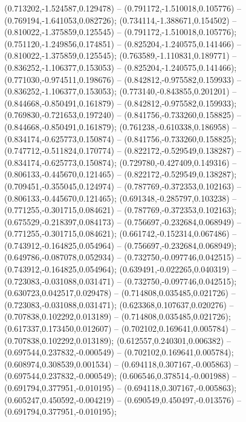  (0.713202,-1.524587,0.129478) -- (0.791172,-1.510018,0.105776) -- (0.769194,-1.641053,0.082726);
 (0.734114,-1.388671,0.154502) -- (0.810022,-1.375859,0.125545) -- (0.791172,-1.510018,0.105776);
 (0.751120,-1.249856,0.174851) -- (0.825204,-1.240575,0.141466) -- (0.810022,-1.375859,0.125545);
 (0.763589,-1.110831,0.189771) -- (0.836252,-1.106377,0.153053) -- (0.825204,-1.240575,0.141466);
 (0.771030,-0.974511,0.198676) -- (0.842812,-0.975582,0.159933) -- (0.836252,-1.106377,0.153053);
 (0.773140,-0.843855,0.201201) -- (0.844668,-0.850491,0.161879) -- (0.842812,-0.975582,0.159933);
 (0.769830,-0.721653,0.197240) -- (0.841756,-0.733260,0.158825) -- (0.844668,-0.850491,0.161879);
 (0.761238,-0.610338,0.186958) -- (0.834174,-0.625773,0.150874) -- (0.841756,-0.733260,0.158825);
 (0.747712,-0.511824,0.170774) -- (0.822172,-0.529549,0.138287) -- (0.834174,-0.625773,0.150874);
 (0.729780,-0.427409,0.149316) -- (0.806133,-0.445670,0.121465) -- (0.822172,-0.529549,0.138287);
 (0.709451,-0.355045,0.124974) -- (0.787769,-0.372353,0.102163) -- (0.806133,-0.445670,0.121465);
 (0.691348,-0.285797,0.103238) -- (0.771255,-0.301715,0.084621) -- (0.787769,-0.372353,0.102163);
 (0.675529,-0.218397,0.084173) -- (0.756697,-0.232684,0.068949) -- (0.771255,-0.301715,0.084621);
 (0.661742,-0.152314,0.067486) -- (0.743912,-0.164825,0.054964) -- (0.756697,-0.232684,0.068949);
 (0.649786,-0.087078,0.052934) -- (0.732750,-0.097746,0.042515) -- (0.743912,-0.164825,0.054964);
 (0.639491,-0.022265,0.040319) -- (0.723083,-0.031088,0.031471) -- (0.732750,-0.097746,0.042515);
 (0.630723,0.042517,0.029478) -- (0.714808,0.035485,0.021726) -- (0.723083,-0.031088,0.031471);
 (0.623368,0.107637,0.020276) -- (0.707838,0.102292,0.013189) -- (0.714808,0.035485,0.021726);
 (0.617337,0.173450,0.012607) -- (0.702102,0.169641,0.005784) -- (0.707838,0.102292,0.013189);
 (0.612557,0.240301,0.006382) -- (0.697544,0.237832,-0.000549) -- (0.702102,0.169641,0.005784);
 (0.608974,0.308539,0.001534) -- (0.694118,0.307167,-0.005863) -- (0.697544,0.237832,-0.000549);
 (0.606546,0.378514,-0.001988) -- (0.691794,0.377951,-0.010195) -- (0.694118,0.307167,-0.005863);
 (0.605247,0.450592,-0.004219) -- (0.690549,0.450497,-0.013576) -- (0.691794,0.377951,-0.010195);
